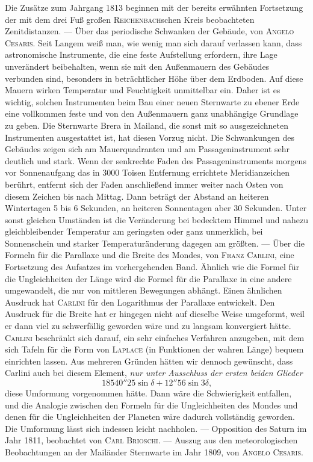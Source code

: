 Die Zusätze zum Jahrgang 1813 beginnen mit der bereits erwähnten Fortsetzung der mit dem drei Fuß großen \textsc{Reichenbach}schen Kreis beobachteten Zenitdistanzen. --- Über das periodische Schwanken der Gebäude, von \textsc{Angelo Cesaris}. Seit Langem weiß man, wie wenig man sich darauf verlassen kann, dass astronomische Instrumente, die eine feste Aufstellung erfordern, ihre Lage unverändert beibehalten, wenn sie mit den Außenmauern des Gebäudes verbunden sind, besonders in beträchtlicher Höhe über dem Erdboden. Auf diese Mauern wirken Temperatur und Feuchtigkeit unmittelbar ein. Daher ist es wichtig, solchen Instrumenten beim Bau einer neuen Sternwarte zu ebener Erde eine vollkommen feste und von den Außenmauern ganz unabhängige Grundlage zu geben. Die Sternwarte Brera in Mailand, die sonst mit so ausgezeichneten Instrumenten ausgestattet ist, hat diesen Vorzug nicht. Die Schwankungen des Gebäudes zeigen sich am Mauerquadranten und am Passageninstrument sehr deutlich und stark. Wenn der senkrechte Faden des Passageninstruments morgens vor Sonnenaufgang das in 3000 Toisen Entfernung errichtete Meridianzeichen berührt, entfernt sich der Faden anschließend immer weiter nach Osten von diesem Zeichen bis nach Mittag. Dann beträgt der Abstand an heiteren Wintertagen 5 bis 6 Sekunden, an heiteren Sonnentagen aber 30 Sekunden. Unter sonst gleichen Umständen ist die Veränderung bei bedecktem Himmel und nahezu gleichbleibender Temperatur am geringsten oder ganz unmerklich, bei Sonnenschein und starker Temperaturänderung dagegen am größten. --- Über die Formeln für die Parallaxe und die Breite des Mondes, von \textsc{Franz Carlini}, eine Fortsetzung des Aufsatzes im vorhergehenden Band. Ähnlich wie die Formel für die Ungleichheiten der Länge wird die Formel für die Parallaxe in eine andere umgewandelt, die nur von mittleren Bewegungen abhängt. Einen ähnlichen Ausdruck hat \textsc{Carlini} für den Logarithmus der Parallaxe entwickelt. Den Ausdruck für die Breite hat er hingegen nicht auf dieselbe Weise umgeformt, weil er dann viel zu schwerfällig geworden wäre und zu langsam konvergiert hätte. \textsc{Carlini} beschränkt sich darauf, ein sehr einfaches Verfahren anzugeben, mit dem sich Tafeln für die Form von \textsc{Laplace} (in Funktionen der wahren Länge) bequem einrichten lassen. Aus mehreren Gründen hätten wir dennoch gewünscht, dass Carlini auch bei diesem Element, \emph{nur unter Ausschluss der ersten beiden Glieder}
\[
18540''25\sin\delta + 12''56\sin 3\delta\text{,}
\]
diese Umformung vorgenommen hätte. Dann wäre die Schwierigkeit entfallen, und die Analogie zwischen den Formeln für die Ungleichheiten des Mondes und denen für die Ungleichheiten der Planeten wäre dadurch vollständig geworden. Die Umformung lässt sich indessen leicht nachholen. --- Opposition des Saturn im Jahr 1811, beobachtet von \textsc{Carl Brioschi}. --- Auszug aus den meteorologischen Beobachtungen an der Mailänder Sternwarte im Jahr 1809, von \textsc{Angelo Cesaris}.

